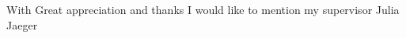 \documentclass[Thesis_main]{subfiles}
\begin{document}
	With Great appreciation and thanks I would like to mention my supervisor Julia Jaeger
	
\end{document}
